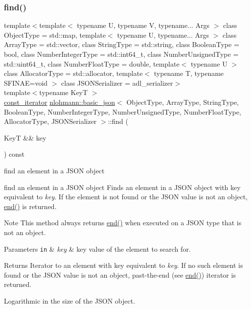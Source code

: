 \subsubsection{\texorpdfstring{find()}{find()}\hspace{0.1cm}{\footnotesize\ttfamily [2/2]}}
{\footnotesize\ttfamily template$<$template$<$ typename U, typename V, typename... Args $>$ class Object\+Type = std\+::map, template$<$ typename U, typename... Args $>$ class Array\+Type = std\+::vector, class String\+Type  = std\+::string, class Boolean\+Type  = bool, class Number\+Integer\+Type  = std\+::int64\+\_\+t, class Number\+Unsigned\+Type  = std\+::uint64\+\_\+t, class Number\+Float\+Type  = double, template$<$ typename U $>$ class Allocator\+Type = std\+::allocator, template$<$ typename T, typename S\+F\+I\+N\+A\+E=void $>$ class J\+S\+O\+N\+Serializer = adl\+\_\+serializer$>$ \\
template$<$typename KeyT $>$ \\
\mbox{\hyperlink{classnlohmann_1_1basic__json_a41a70cf9993951836d129bb1c2b3126a}{const\+\_\+iterator}} \mbox{\hyperlink{classnlohmann_1_1basic__json}{nlohmann\+::basic\+\_\+json}}$<$ Object\+Type, Array\+Type, String\+Type, Boolean\+Type, Number\+Integer\+Type, Number\+Unsigned\+Type, Number\+Float\+Type, Allocator\+Type, J\+S\+O\+N\+Serializer $>$\+::find (\begin{DoxyParamCaption}\item[{KeyT \&\&}]{key }\end{DoxyParamCaption}) const\hspace{0.3cm}{\ttfamily [inline]}}



find an element in a J\+S\+ON object 

find an element in a J\+S\+ON object Finds an element in a J\+S\+ON object with key equivalent to {\itshape key}. If the element is not found or the J\+S\+ON value is not an object, \mbox{\hyperlink{classnlohmann_1_1basic__json_a13e032a02a7fd8a93fdddc2fcbc4763c}{end()}} is returned.

\begin{DoxyNote}{Note}
This method always returns \mbox{\hyperlink{classnlohmann_1_1basic__json_a13e032a02a7fd8a93fdddc2fcbc4763c}{end()}} when executed on a J\+S\+ON type that is not an object.
\end{DoxyNote}

\begin{DoxyParams}[1]{Parameters}
\mbox{\tt in}  & {\em key} & key value of the element to search for.\\
\hline
\end{DoxyParams}
\begin{DoxyReturn}{Returns}
Iterator to an element with key equivalent to {\itshape key}. If no such element is found or the J\+S\+ON value is not an object, past-\/the-\/end (see \mbox{\hyperlink{classnlohmann_1_1basic__json_a13e032a02a7fd8a93fdddc2fcbc4763c}{end()}}) iterator is returned.
\end{DoxyReturn}
Logarithmic in the size of the J\+S\+ON object.

